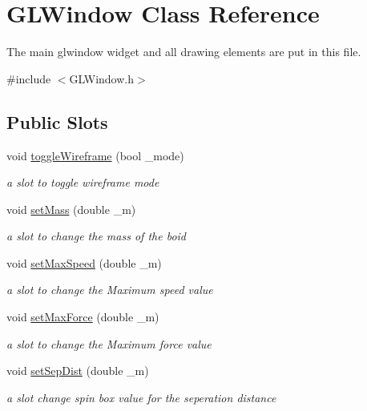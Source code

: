 \hypertarget{classGLWindow}{
\section{GLWindow Class Reference}
\label{classGLWindow}
}


The main glwindow widget and all drawing elements are put in this file.  




{\ttfamily \#include $<$GLWindow.h$>$}

\subsection*{Public Slots}
\begin{DoxyCompactItemize}
\item 
void \hyperlink{classGLWindow_a12c3d0e90d6cc3216cb99b0479840ad8}{toggleWireframe} (bool \_\-mode)
\begin{DoxyCompactList}\small\item\em a slot to toggle wireframe mode \end{DoxyCompactList}\item 
void \hyperlink{classGLWindow_af440070307e4a34550ee7772708e3a99}{setMass} (double \_\-m)
\begin{DoxyCompactList}\small\item\em a slot to change the mass of the boid \end{DoxyCompactList}\item 
void \hyperlink{classGLWindow_a4e1f5f46a23a6c489a173c70af3008ef}{setMaxSpeed} (double \_\-m)
\begin{DoxyCompactList}\small\item\em a slot to change the Maximum speed value \end{DoxyCompactList}\item 
void \hyperlink{classGLWindow_a0ae8e2d08671a68c99160aa53a6aa9f1}{setMaxForce} (double \_\-m)
\begin{DoxyCompactList}\small\item\em a slot to change the Maximum force value \end{DoxyCompactList}\item 
void \hyperlink{classGLWindow_a1e3533b5037b96ad52a47508354bc196}{setSepDist} (double \_\-m)
\begin{DoxyCompactList}\small\item\em a slot change spin box value for the seperation distance \end{DoxyCompactList}\item 

\end{DoxyCompactItemize}
